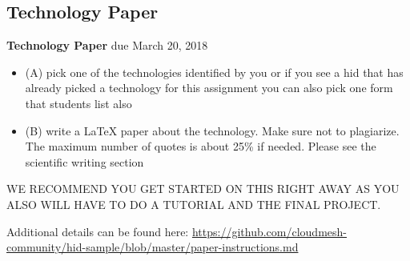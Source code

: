 \subsection{Technology Paper}
\label{E:616-tech-paper}

\begin{exercise} {\bf Technology Paper} due March 20, 2018

\begin{itemize}
Read the following two points to assist you in starting your paper 
\item (A) pick one of the technologies identified by you or if you see a
  hid that has already picked a technology for this assignment you can
  also pick one form that students list also

\item (B) write a LaTeX paper about the technology. Make sure not to
  plagiarize. The maximum number of quotes is about 25\% if
  needed. Please see the scientific writing section

\end{itemize}
 WE RECOMMEND YOU GET STARTED ON THIS RIGHT AWAY AS YOU ALSO WILL HAVE
 TO DO A TUTORIAL AND THE FINAL PROJECT.

Additional details can be found here:
\url{https://github.com/cloudmesh-community/hid-sample/blob/master/paper-instructions.md}

\end{exercise}

